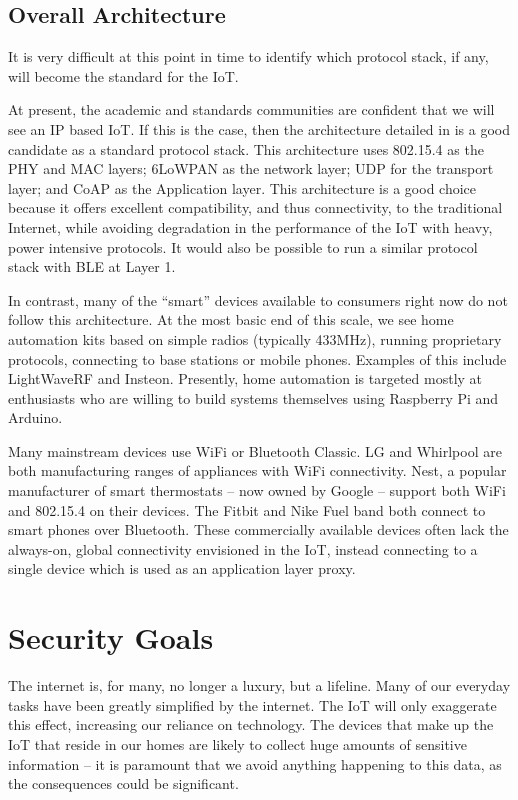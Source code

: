 \documentclass[10pt,journal,compsoc]{IEEEtran}
\begin{document}
\subsection{Overall Architecture}
It is very difficult at this point in time to identify which protocol stack, if
any, will become the standard for the IoT. 

At present, the academic and standards communities are confident that we will
see an IP based IoT. If this is the case, then the architecture detailed in
\cite{Palattella2013} is a good candidate as a standard protocol stack. This
architecture uses 802.15.4 as the PHY and MAC layers; 6LoWPAN as the network
layer; UDP for the transport layer; and CoAP as the Application layer. This
architecture is a good choice because it offers excellent compatibility, and
thus connectivity, to the traditional Internet, while avoiding degradation in
the performance of the IoT with heavy, power intensive protocols. It would also
be possible to run a similar protocol stack with BLE at Layer 1.  

In contrast, many of the ``smart'' devices available to consumers right now do
not follow this architecture. At the most basic end of this scale, we see home
automation kits based on simple radios (typically 433MHz), running proprietary
protocols, connecting to base stations or mobile phones. Examples of this
include LightWaveRF and Insteon. Presently, home automation is targeted mostly
at enthusiasts who are willing to build systems themselves using Raspberry Pi
and Arduino.  

Many mainstream devices use WiFi or Bluetooth Classic. LG and Whirlpool are
both manufacturing ranges of appliances with WiFi connectivity. Nest, a popular
manufacturer of smart thermostats -- now owned by Google -- support both WiFi
and 802.15.4 on their devices. The Fitbit and Nike Fuel band both connect to
smart phones over Bluetooth. These commercially available devices often lack
the always-on,  global connectivity envisioned in the IoT, instead connecting
to a single device which is used as an application layer proxy.

\section{Security Goals}
The internet is, for many, no longer a luxury, but a lifeline. Many of our
everyday tasks have been greatly simplified by the internet. The IoT will only
exaggerate this effect, increasing our reliance on technology. The devices that
make up the IoT that reside in our homes are likely to collect huge amounts of
sensitive information -- it is paramount that we avoid anything happening to
this data, as the consequences could be significant. 
\end{document}
